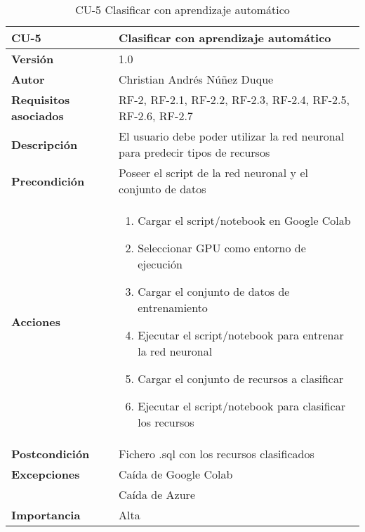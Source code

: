 \begin{table}[p]
	\centering
	\begin{tabularx}{\linewidth}{ p{} p{} }
		\toprule
		\textbf{CU-5}    & \textbf{Clasificar con aprendizaje automático}\\
		\toprule
		\textbf{Versión}              & 1.0    \\
		\textbf{Autor}                & Christian Andrés Núñez Duque \\
		\textbf{Requisitos asociados} & RF-2, RF-2.1, RF-2.2, RF-2.3, RF-2.4, RF-2.5, RF-2.6, RF-2.7 \\
		\textbf{Descripción}          & El usuario debe poder utilizar la red neuronal para predecir tipos de recursos \\
		\textbf{Precondición}         & Poseer el script de la red neuronal y el conjunto de datos \\
		\textbf{Acciones}             &
		\begin{enumerate}
			\def\labelenumi{\arabic{enumi}.}
			\tightlist
			\item Cargar el script/notebook en Google Colab
			\item Seleccionar GPU como entorno de ejecución
			\item Cargar el conjunto de datos de entrenamiento
			\item Ejecutar el script/notebook para entrenar la red neuronal
			\item Cargar el conjunto de recursos a clasificar
			\item Ejecutar el script/notebook para clasificar los recursos
		\end{enumerate}\\
		\textbf{Postcondición}        & Fichero .sql con los recursos clasificados \\
		\textbf{Excepciones}          & Caída de Google Colab \\ & Caída de Azure \\
		\textbf{Importancia}          & Alta \\
		\bottomrule
	\end{tabularx}
	\caption{CU-5 Clasificar con aprendizaje automático}
\end{table}


